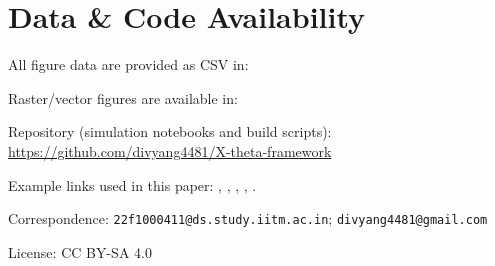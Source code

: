 \section*{Data \& Code Availability}
All figure data are provided as CSV in:
\\

Raster/vector figures are available in:
\\

Repository (simulation notebooks and build scripts):
\\\url{https://github.com/divyang4481/X-theta-framework}

\noindent Example links used in this paper:
, 
, 
, 
, 
.

\bigskip
\noindent Correspondence: \texttt{22f1000411@ds.study.iitm.ac.in}; \texttt{divyang4481@gmail.com}

\noindent License: CC BY-SA 4.0
